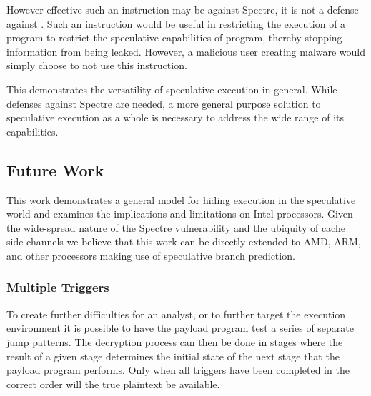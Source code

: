 However effective such an instruction may be against Spectre, it is not a
defense against \speculake. Such an instruction would be useful in restricting
the execution of a program to restrict the speculative capabilities of program,
thereby stopping information from being leaked. However, a malicious user
creating \speculake malware would simply choose to not use this instruction.

This demonstrates the versatility of speculative execution in general. While
defenses against Spectre are needed, a more general purpose solution to
speculative execution as a whole is necessary to address the wide range of its
capabilities.


\subsection{Future Work}
\label{subsec:future-work}

This work demonstrates a general model for hiding execution in 
the speculative world and examines the implications and limitations on 
Intel processors. Given the wide-spread nature of the Spectre vulnerability 
and the ubiquity of cache side-channels we believe that this work can 
be directly extended to AMD, ARM, and other processors making use of
speculative branch prediction.

\subsubsection{Multiple Triggers}
To create further difficulties for an analyst, or to further target the
execution environment it is possible to have the payload program test a series
of separate jump patterns. The decryption process can then be done in stages
where the result of a given stage determines the initial state of the next stage
that the payload program performs. Only when all triggers have been completed in
the correct order will the true plaintext be available. 

